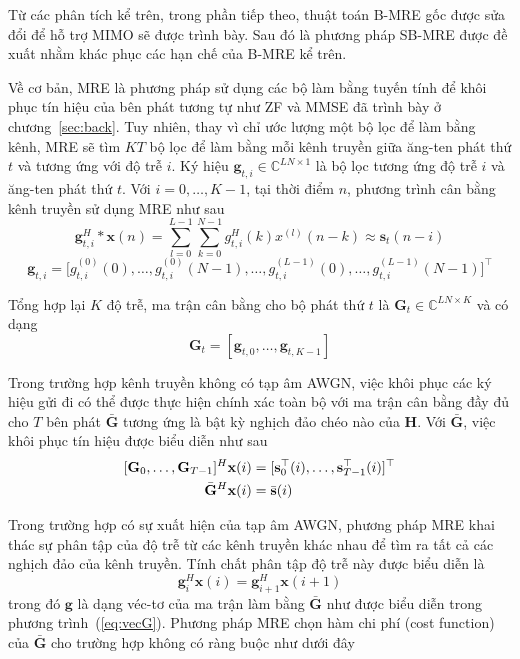 Từ các phân tích kể trên, trong phần tiếp theo, thuật toán B-MRE gốc được sửa đổi để hỗ trợ MIMO sẽ được trình bày. Sau đó là phương pháp SB-MRE được đề xuất nhằm khác phục các hạn chế của B-MRE kể trên.

Về cơ bản, MRE là phương pháp sử dụng các bộ làm bằng tuyến tính để khôi phục tín hiệu của bên phát tương tự như ZF và MMSE đã trình bày ở chương~\ref{sec:back}. Tuy nhiên, thay vì chỉ ước lượng một bộ lọc để làm bằng kênh, MRE sẽ tìm $KT$ bộ lọc để làm bằng mỗi kênh truyền giữa ăng-ten phát thứ $t$ và tương ứng với độ trễ $i$. Ký hiệu $\mathbf{g}_{t, i}  \in \mathbb{C}^{LN \times 1}$ là bộ lọc tương ứng độ trễ $i$ và ăng-ten phát thứ $t$. Với \mbox{$i=0, \ldots, K-1$}, tại thời điểm $n$, phương trình cân bằng kênh truyền sử dụng MRE như sau
\begin{equation}
    \mathbf{g}^H_{t, i} * \mathbf{x}(n)=\sum_{l=0}^{L-1}\sum_{k=0}^{N-1} g^H_{t,i}(k) x^{(l)}(n-k) \approx \mathbf{s}_t(n-i)
\end{equation}
\begin{equation}
    \mathbf{g}_{t,i}=\big[g_{t, i}^{(0)}(0), \ldots, g_{t, i}^{(0)}(N - 1), \ldots,
    g_{t, i}^{(L-1)}(0), \ldots, g_{t, i}^{(L-1)} (N-1) \big]^\top
\end{equation}

Tổng hợp lại $K$ độ trễ, ma trận cân bằng cho bộ phát thứ $t$ là
 $\mathbf{G}_t \in \mathbb{C}^{LN \times K}$ và có dạng
\begin{equation}
    \mathbf{G}_t = [\mathbf{g}_{t, 0}, \ldots, \mathbf{g}_{t, K-1}]
\end{equation}

Trong trường hợp kênh truyền không có tạp âm AWGN, việc khôi phục các ký hiệu gửi đi có thể được thực hiện chính xác toàn bộ với ma trận cân bằng đầy đủ cho $T$ bên phát $\bar{\mathbf{G}}$ tương ứng là bật kỳ nghịch đảo chéo nào của $\mathbf{H}$. Với $\bar{\mathbf{G}}$, việc khôi phục tín hiệu được biểu diễn như sau
\begin{equation}
    \begin{aligned}
        \relax[\mathbf{G}_0, \ldots, \mathbf{G}_{T-1}]^{H} 
        \mathbf{x}(i)
        &= [\mathbf{s}_0^\top(i), \ldots, \mathbf{s}^\top_{T-1}(i)]^\top \\
        \bar{\mathbf{G}}^H \mathbf{x}(i) &= \bar{\mathbf{s}}(i)
    \end{aligned}   
\end{equation}

Trong trường hợp có sự xuất hiện của tạp âm AWGN, phương pháp MRE khai thác sự phân tập của độ trễ từ các kênh truyền khác nhau để tìm ra tất cả các nghịch đảo của kênh truyền. Tính chất phân tập độ trễ này được biểu diễn là
\begin{equation}
\label{eq:contrant}
    \mathbf{g}_i^H \mathbf{x}(i) = \mathbf{g}_{i+1}^H \mathbf{x}(i+1)
\end{equation}
trong đó $\mathbf{g}$ là dạng véc-tơ của ma trận làm bằng $\bar{\mathbf{G}}$ như được biểu diễn trong phương trình~(\ref{eq:vecG}). Phương pháp MRE chọn hàm chi phí (cost function) của $\bar{\mathbf{G}}$ cho trường hợp không có ràng buộc như dưới đây

